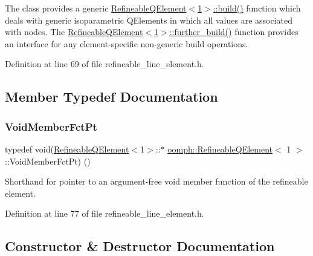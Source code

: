 The class provides a generic \hyperlink{classoomph_1_1RefineableQElement_3_011_01_4_aa2104bae648ac4b34caecbbb5fb254dc}{Refineable\+Q\+Element$<$1$>$\+::build()} function which deals with generic isoparametric Q\+Elements in which all values are associated with nodes. The \hyperlink{classoomph_1_1RefineableElement_a26628ce36dfad028686adeb4694a9ef3}{Refineable\+Q\+Element$<$1$>$\+::further\+\_\+build()} function provides an interface for any element-\/specific non-\/generic build operations. 

Definition at line 69 of file refineable\+\_\+line\+\_\+element.\+h.



\subsection{Member Typedef Documentation}
\mbox{\label{classoomph_1_1RefineableQElement_3_011_01_4_a0f87806928148f78469bb23f1a93e1d8}} 
\subsubsection{\texorpdfstring{Void\+Member\+Fct\+Pt}{VoidMemberFctPt}}
{\footnotesize\ttfamily typedef void(\hyperlink{classoomph_1_1RefineableQElement}{Refineable\+Q\+Element}$<$1$>$\+::$\ast$ \hyperlink{classoomph_1_1RefineableQElement}{oomph\+::\+Refineable\+Q\+Element}$<$ 1 $>$\+::Void\+Member\+Fct\+Pt) ()}



Shorthand for pointer to an argument-\/free void member function of the refineable element. 



Definition at line 77 of file refineable\+\_\+line\+\_\+element.\+h.



\subsection{Constructor \& Destructor Documentation}
\mbox{\label{classoomph_1_1RefineableQElement_3_011_01_4_a6b1dd333b6493916cc2b246cac0e00c9}} 
